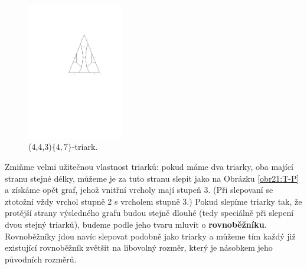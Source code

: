 \begin{figure}[h!]\centering
\includegraphics[height=60mm]{../img/triarc}
\caption{(4,4,3)$ \lbrace 4,7\rbrace $-triark.}
\label{obr03:triark}
\end{figure}

Zmiňme velmi užitečnou vlastnost triarků: pokud máme dva triarky, oba mající stranu stejné délky, můžeme je za tuto stranu slepit jako na Obrázku \ref{obr21:T-P} a získáme opět graf, jehož vnitřní vrcholy mají stupeň 3. (Při slepovaní se ztotožní vždy vrchol stupně 2 s vrcholem stupně 3.) Pokud slepíme triarky tak, že protější strany výsledného grafu budou stejně dlouhé (tedy speciálně při slepení dvou stejný triarků), budeme podle jeho tvaru mluvit o \textbf{rovnoběžníku}. Rovnoběžníky jdou navíc slepovat podobně jako triarky a můžeme tím každý již existující rovnoběžník zvětšit na libovolný rozměr, který je násobkem jeho původních rozměrů.


